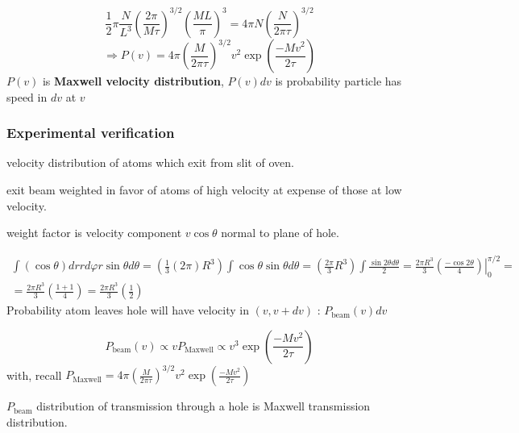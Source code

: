 \documentclass[twoside]{amsart}
\theoremstyle{plain}
\theoremstyle{definition}
\begin{document}
\[
\frac{1}{2} \pi \frac{N}{L^3} \left( \frac{2\pi }{ M \tau} \right)^{3/2} \left( \frac{ ML }{\pi } \right)^3 = 4\pi N \left( \frac{N}{2\pi \tau} \right)^{3/2}
\]
\begin{equation}
\Longrightarrow P(v) = 4\pi \left( \frac{M}{2\pi \tau } \right)^{3/2} v^2 \exp{ \left( \frac{- Mv^2}{ 2\tau } \right) } 
\end{equation}
$P(v)$ is \textbf{Maxwell velocity distribution}, $P(v)dv$ is probability particle has speed in $dv$ at $v$

\subsubsection*{Experimental verification}

velocity distribution of atoms which exit from slit of oven.  

exit beam weighted in favor of atoms of high velocity at expense of those at low velocity. 

weight factor is velocity component $v\cos{\theta}$ normal to plane of hole. 

\[
\begin{gathered}
  \int (\cos{\theta}) dr rd\varphi r \sin{\theta} d\theta = (\frac{1}{3} (2\pi ) R^3) \int \cos{\theta} \sin{\theta} d\theta = ( \frac{2\pi}{3} R^3) \int \frac{\sin{2\theta} d\theta}{ 2 } = \frac{2\pi R^3}{3} \left. \left( \frac{ - \cos{2\theta} }{4} \right) \right|_0^{\pi/2} = \\
  = \frac{ 2\pi R^3}{3} \left( \frac{1+ 1}{4} \right) = \frac{ 2\pi R^3}{3} \left( \frac{1}{2} \right)
\end{gathered}
\]
Probability atom leaves hole will have velocity in $(v,v+dv)$ : $P_{\text{beam}}(v) dv$

\[
P_{\text{beam}}(v) \propto vP_{\text{Maxwell} } \propto v^3 \exp{ \left( \frac{ -Mv^2}{ 2\tau } \right) }
\]
with, recall $P_{\text{Maxwell}} = 4\pi \left( \frac{ M }{ 2\pi \tau } \right)^{3/2} v^2 \exp{ \left( \frac{-Mv^2}{ 2\tau } \right) }$ 

$P_{\text{beam}}$ distribution of transmission through a hole is Maxwell transmission distribution. 
\end{document}
